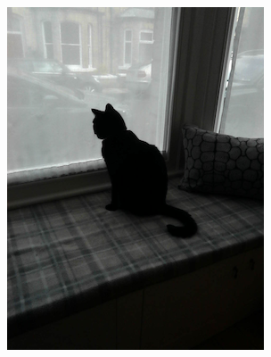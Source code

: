 \documentclass{l4proj}
\begin{document}
\begin{figure}[ht]
  \centering
  \begin{subfigure}[h!]{0.18\textwidth}
    \includegraphics[width=\textwidth, trim={0cm 1.6cm 0cm 1.6cm}, clip]{images/dataset/cat/rgb.png}

\end{subfigure}
\end{figure}
\end{document}
